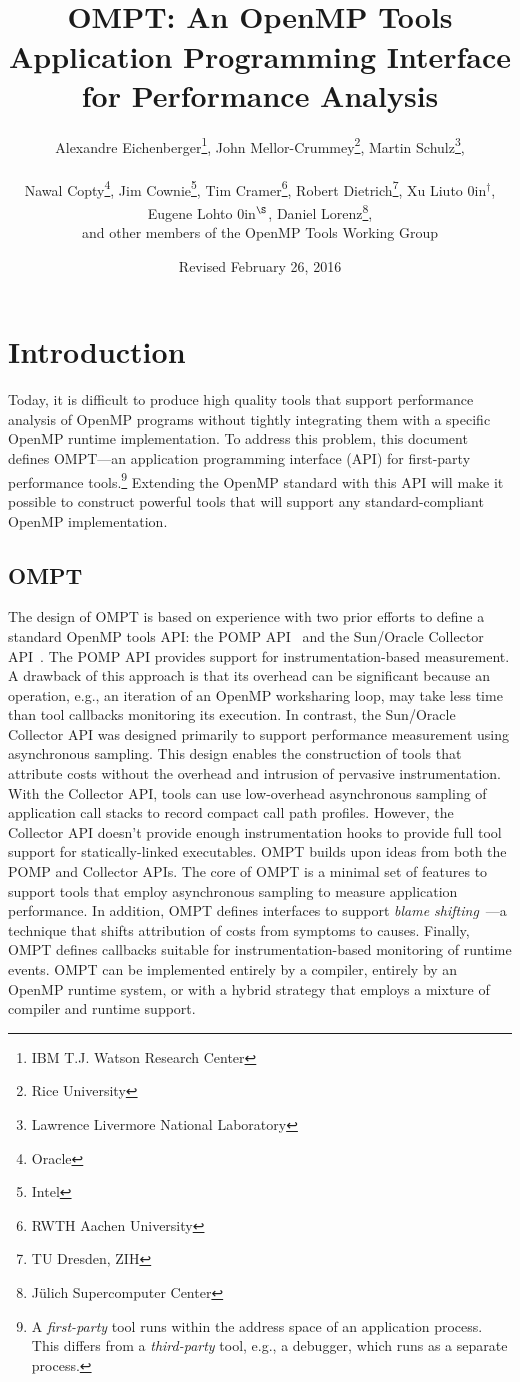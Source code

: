 \documentclass{article}
\title{OMPT: An OpenMP\textsuperscript{\textregistered} Tools Application Programming Interface for Performance Analysis}
\author{Alexandre Eichenberger\thanks{IBM T.J. Watson Research Center}, 
John Mellor-Crummey\thanks{Rice University}, 
Martin Schulz\thanks{Lawrence Livermore National Laboratory},
\\~\\
Nawal Copty\thanks{Oracle}, 
Jim Cownie\thanks{Intel},
Tim Cramer\thanks{RWTH Aachen University}, 
Robert Dietrich\thanks{TU Dresden, ZIH},
Xu Liu\hbox to 0in{$^\dagger$\hss},
Eugene Loh\hbox to 0in{$^\S$\hss}, 
Daniel Lorenz\thanks{J\"{u}lich Supercomputer Center}, 
\\
and other members of the OpenMP Tools Working Group}
\date{Revised February 26, 2016}
\begin{document}
  

                                           
\maketitle
\section{Introduction}
Today, it is difficult to produce high quality tools that support 
performance analysis of OpenMP programs without tightly integrating them with a specific OpenMP runtime implementation. To address this problem, this document defines OMPT---an application programming interface (API) for first-party performance tools.\footnote{A {\em first-party} tool runs within the address space of an application process. This differs from a {\em third-party} tool, e.g., a debugger, which runs as a separate process.}  
Extending the OpenMP standard with this API  will make it possible to construct powerful tools that will support any standard-compliant OpenMP implementation.

\subsection{OMPT}

The design of OMPT is based on experience with two prior efforts to define a standard OpenMP tools API: the POMP API~\cite{Mohr:EWOMP02} and the Sun/Oracle Collector API~\cite{SunCollector,Jost:2005:AND:1892830.1892858}. 
The POMP API provides support for instrumentation-based measurement. A drawback of this approach  is that its overhead can be significant because an operation, e.g., an iteration of an OpenMP worksharing loop, may take less time than tool callbacks monitoring its execution. 
In contrast, 
the Sun/Oracle Collector API was  designed primarily to support performance measurement 
using asynchronous sampling. This  design enables the construction of tools that attribute costs without the overhead and intrusion of pervasive instrumentation. With the Collector API, tools
 can use low-overhead asynchronous  sampling of application call stacks to record compact call path profiles. However, the Collector API doesn't provide enough instrumentation hooks to provide full tool support for statically-linked executables.
OMPT builds upon ideas from both the POMP and  Collector APIs. The core of OMPT is a minimal set of features to support tools that employ asynchronous sampling to measure application performance. In addition, OMPT defines  interfaces to support  {\em blame shifting}~\cite{Tallent:PPoPP09,Tallent:PPoPP10}---a technique that shifts attribution of costs from symptoms to causes.
Finally, OMPT defines callbacks suitable for instrumentation-based monitoring of runtime events. 
 OMPT can be implemented entirely by a compiler, entirely by an OpenMP runtime system, or with a hybrid strategy that employs a mixture of compiler and runtime support.
\end{document}

